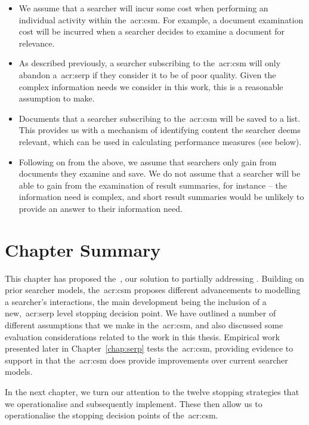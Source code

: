 \begin{itemize}
    \item{ We assume that a searcher will incur some cost when performing an individual activity within the~\gls{acr:csm}. For example, a document examination cost will be incurred when a searcher decides to examine a document for relevance.}
    \item{ As described previously, a searcher subscribing to the~\gls{acr:csm} will only abandon a~\gls{acr:serp} if they consider it to be of poor quality. Given the complex information needs we consider in this work, this is a reasonable assumption to make.}
    \item{ Documents that a searcher subscribing to the~\gls{acr:csm} will be saved to a list. This provides us with a mechanism of identifying content the searcher deems relevant, which can be used in calculating performance measures (see below).}
    \item{ Following on from the above, we assume that searchers only gain from documents they examine and save. We do not assume that a searcher will be able to gain from the examination of result summaries, for instance -- the information need is complex, and short result summaries would be unlikely to provide an answer to their information need.}
\end{itemize}

\section{Chapter Summary}
This chapter has proposed the~, our solution to partially addressing . Building on prior searcher models, the~\gls{acr:csm} proposes different advancements to modelling a searcher's interactions, the main development being the inclusion of a new,~\gls{acr:serp} level stopping decision point. We have outlined a number of different assumptions that we make in the~\gls{acr:csm}, and also discussed some evaluation considerations related to the work in this thesis. Empirical work presented later in Chapter~\ref{chap:serp} tests the~\gls{acr:csm}, providing evidence to support  in that the~\gls{acr:csm} does provide improvements over current searcher models.

In the next chapter, we turn our attention to the twelve stopping strategies that we operationalise and subsequently implement. These then allow us to operationalise the stopping decision points of the~\gls{acr:csm}.

